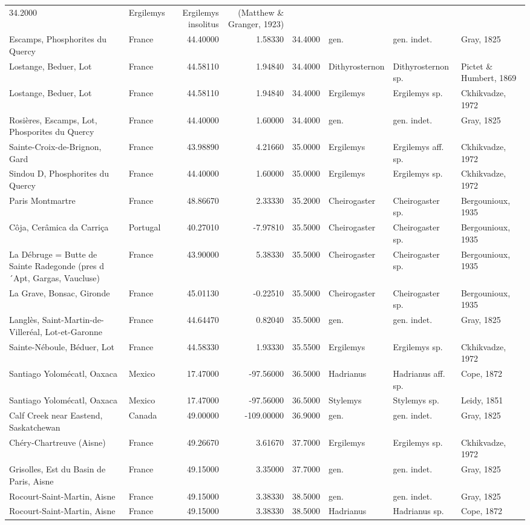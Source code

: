 \documentclass[]{article}
\begin{document}
\begin{longtable}[]{@{}llrrrlll@{}}
34.2000 & Ergilemys & Ergilemys insolitus & (Matthew \& Granger,
1923)\tabularnewline
Escamps, Phosphorites du Quercy & France & 44.40000 & 1.58330 & 34.4000
& gen. & gen. indet. & Gray, 1825\tabularnewline
Lostange, Beduer, Lot & France & 44.58110 & 1.94840 & 34.4000 &
Dithyrosternon & Dithyrosternon sp. & Pictet \& Humbert,
1869\tabularnewline
Lostange, Beduer, Lot & France & 44.58110 & 1.94840 & 34.4000 &
Ergilemys & Ergilemys sp. & Ckhikvadze, 1972\tabularnewline
Rosières, Escamps, Lot, Phosporites du Quercy & France & 44.40000 &
1.60000 & 34.4000 & gen. & gen. indet. & Gray, 1825\tabularnewline
Sainte-Croix-de-Brignon, Gard & France & 43.98890 & 4.21660 & 35.0000 &
Ergilemys & Ergilemys aff. sp. & Ckhikvadze, 1972\tabularnewline
Sindou D, Phosphorites du Quercy & France & 44.40000 & 1.60000 & 35.0000
& Ergilemys & Ergilemys sp. & Ckhikvadze, 1972\tabularnewline
Paris Montmartre & France & 48.86670 & 2.33330 & 35.2000 & Cheirogaster
& Cheirogaster sp. & Bergounioux, 1935\tabularnewline
Côja, Cerâmica da Carriça & Portugal & 40.27010 & -7.97810 & 35.5000 &
Cheirogaster & Cheirogaster sp. & Bergounioux, 1935\tabularnewline
La Débruge = Butte de Sainte Radegonde (pres d´Apt, Gargas, Vaucluse) &
France & 43.90000 & 5.38330 & 35.5000 & Cheirogaster & Cheirogaster sp.
& Bergounioux, 1935\tabularnewline
La Grave, Bonsac, Gironde & France & 45.01130 & -0.22510 & 35.5000 &
Cheirogaster & Cheirogaster sp. & Bergounioux, 1935\tabularnewline
Langlès, Saint-Martin-de-Villeréal, Lot-et-Garonne & France & 44.64470 &
0.82040 & 35.5000 & gen. & gen. indet. & Gray, 1825\tabularnewline
Sainte-Néboule, Béduer, Lot & France & 44.58330 & 1.93330 & 35.5500 &
Ergilemys & Ergilemys sp. & Ckhikvadze, 1972\tabularnewline
Santiago Yolomécatl, Oaxaca & Mexico & 17.47000 & -97.56000 & 36.5000 &
Hadrianus & Hadrianus aff. sp. & Cope, 1872\tabularnewline
Santiago Yolomécatl, Oaxaca & Mexico & 17.47000 & -97.56000 & 36.5000 &
Stylemys & Stylemys sp. & Leidy, 1851\tabularnewline
Calf Creek near Eastend, Saskatchewan & Canada & 49.00000 & -109.00000 &
36.9000 & gen. & gen. indet. & Gray, 1825\tabularnewline
Chéry-Chartreuve (Aisne) & France & 49.26670 & 3.61670 & 37.7000 &
Ergilemys & Ergilemys sp. & Ckhikvadze, 1972\tabularnewline
Grisolles, Est du Basin de Paris, Aisne & France & 49.15000 & 3.35000 &
37.7000 & gen. & gen. indet. & Gray, 1825\tabularnewline
Rocourt-Saint-Martin, Aisne & France & 49.15000 & 3.38330 & 38.5000 &
gen. & gen. indet. & Gray, 1825\tabularnewline
Rocourt-Saint-Martin, Aisne & France & 49.15000 & 3.38330 & 38.5000 &
Hadrianus & Hadrianus sp. & Cope, 1872\tabularnewline

\end{longtable}
\end{document}
